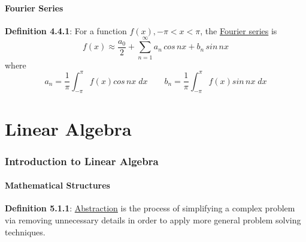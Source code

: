 \documentclass{article}
\newcommand{\definition}[2]{\textbf{Definition #1}: #2\label{def:#1}}
\begin{document}
\subsection{Fourier Series}

\definition{4.4.1}{For a function \(f(x), -\pi < x < \pi\), the \underline{Fourier series} is 
\begin{equation}
    f(x) \approx \frac{a_0}{2} + \sum_{n=1}^{\infty}a_n \,cos\,nx + b_n\,sin\,nx
\end{equation}
where 
\begin{equation}
    a_n = \frac{1}{\pi}\int_{-\pi}^{\pi}f(x)cos\,nx \; dx \qquad b_n = \frac{1}{\pi}\int_{-\pi}^{\pi}f(x)sin\,nx \; dx
\end{equation}
}

\newpage\part{Linear Algebra}\label{part:2.la}

\section{Introduction to Linear Algebra}

\subsection{Mathematical Structures}

\definition{5.1.1}{\underline{Abstraction} is the process of simplifying a complex problem via removing unnecessary details in order to apply more general problem solving techniques.}
\end{document}
